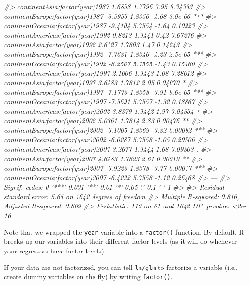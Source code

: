 \documentclass[
]{book}
\newenvironment{Shaded}{\begin{snugshade}}{\end{snugshade}}
\newcommand{\CommentTok}[1]{\textcolor[rgb]{0.56,0.35,0.01}{\textit{#1}}}
\begin{document}
\begin{Shaded}
\begin{Highlighting}[]
\CommentTok{#> continentAsia:factor(year)1987       1.6858     1.7796    0.95  0.34363    }
\CommentTok{#> continentEurope:factor(year)1987    -8.5955     1.8350   -4.68  3.0e-06 ***}
\CommentTok{#> continentOceania:factor(year)1987   -9.4104     5.7554   -1.64  0.10223    }
\CommentTok{#> continentAmericas:factor(year)1992   0.8213     1.9441    0.42  0.67276    }
\CommentTok{#> continentAsia:factor(year)1992       2.6127     1.7803    1.47  0.14243    }
\CommentTok{#> continentEurope:factor(year)1992    -7.7631     1.8346   -4.23  2.5e-05 ***}
\CommentTok{#> continentOceania:factor(year)1992   -8.2567     5.7555   -1.43  0.15160    }
\CommentTok{#> continentAmericas:factor(year)1997   2.1006     1.9443    1.08  0.28012    }
\CommentTok{#> continentAsia:factor(year)1997       3.6483     1.7812    2.05  0.04070 *  }
\CommentTok{#> continentEurope:factor(year)1997    -7.1773     1.8358   -3.91  9.6e-05 ***}
\CommentTok{#> continentOceania:factor(year)1997   -7.5691     5.7557   -1.32  0.18867    }
\CommentTok{#> continentAmericas:factor(year)2002   3.8379     1.9442    1.97  0.04854 *  }
\CommentTok{#> continentAsia:factor(year)2002       5.0361     1.7814    2.83  0.00476 ** }
\CommentTok{#> continentEurope:factor(year)2002    -6.1005     1.8369   -3.32  0.00092 ***}
\CommentTok{#> continentOceania:factor(year)2002   -6.0287     5.7558   -1.05  0.29506    }
\CommentTok{#> continentAmericas:factor(year)2007   3.2677     1.9444    1.68  0.09303 .  }
\CommentTok{#> continentAsia:factor(year)2007       4.6483     1.7823    2.61  0.00919 ** }
\CommentTok{#> continentEurope:factor(year)2007    -6.9223     1.8378   -3.77  0.00017 ***}
\CommentTok{#> continentOceania:factor(year)2007   -6.4222     5.7558   -1.12  0.26468    }
\CommentTok{#> ---}
\CommentTok{#> Signif. codes:  0 '***' 0.001 '**' 0.01 '*' 0.05 '.' 0.1 ' ' 1}
\CommentTok{#> }
\CommentTok{#> Residual standard error: 5.65 on 1642 degrees of freedom}
\CommentTok{#> Multiple R-squared:  0.816,  Adjusted R-squared:  0.809 }
\CommentTok{#> F-statistic:  119 on 61 and 1642 DF,  p-value: <2e-16}
\end{Highlighting}
\end{Shaded}

Note that we wrapped the \texttt{year} variable into a \texttt{factor()} function. By default, R breaks up our variables into their different factor levels (as it will do whenever your regressors have factor levels).

If your data are not factorized, you can tell \texttt{lm/glm} to factorize a variable (i.e., create dummy variables on the fly) by writing \texttt{factor()}.
\end{document}
